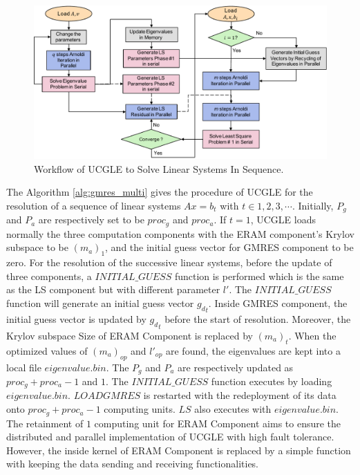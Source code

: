 \begin{figure}[htbp]
	\centering
	\includegraphics[width=6.2in]{fig/uclge_seq_workflow.pdf}
	\caption{Workflow of UCGLE to Solve Linear Systems In Sequence.}
	\label{fig:uclge_seq_workflow}
\end{figure}

The Algorithm \ref{alg:gmres_multi} gives the procedure of UCGLE for the resolution of a sequence of linear systems $Ax= b_t$ with $t \in 1,2,3, \cdots$. Initially, $P_g$ and $P_a$ are respectively set to be $proc_g$ and $proc_a$.  If $t=1$, UCGLE loads normally the three computation components with the ERAM component's Krylov subspace to be $(m_a)_1$, and the initial guess vector for GMRES component to be zero. For the resolution of the successive linear systems, before the update of three components, a $INITIAL\_GUESS$ function is performed which is the same as the LS component but with different parameter $l'$. The $INITIAL\_GUESS$ function will generate an initial guess vector ${g_d}_t$. Inside GMRES component, the initial guess vector is updated by ${g_d}_t$ before the start of resolution. Moreover, the Krylov subspace Size of ERAM Component is replaced by $(m_a)_t$. When the optimized values of $(m_a)_{op}$ and $l'_{op}$ are found, the eigenvalues are kept into a local file $eigenvalue.bin$. The $P_g$ and $P_a$ are respectively updated as  $proc_g+proc_a-1$ and $1$. The $INITIAL\_GUESS$ function executes by loading $eigenvalue.bin$. $LOADGMRES$ is restarted with the redeployment of its data onto $proc_g+proc_a-1$ computing units. $LS$ also executes with $eigenvalue.bin$. The retainment of $1$ computing unit for ERAM Component aims to ensure the distributed and parallel implementation of UCGLE with high fault tolerance. However, the inside kernel of ERAM Component is replaced by a simple function with keeping the data sending and receiving functionalities.

